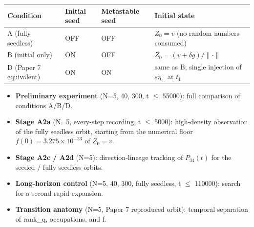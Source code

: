 \documentclass[
  a4paper,
]{article}
\newcounter{none} %
\providecommand{\tightlist}{%
  \setlength{\itemsep}{0pt}\setlength{\parskip}{0pt}}
\begin{document}
{\def\LTcaptype{none} %
\begin{longtable}[]{@{}
  >{\raggedright\arraybackslash}p{}
  >{\centering\arraybackslash}p{}
  >{\centering\arraybackslash}p{}
  >{\raggedright\arraybackslash}p{}@{}}
\toprule\noalign{}
\begin{minipage}[b]{\linewidth}\raggedright
Condition
\end{minipage} & \begin{minipage}[b]{\linewidth}\centering
Initial seed
\end{minipage} & \begin{minipage}[b]{\linewidth}\centering
Metastable seed
\end{minipage} & \begin{minipage}[b]{\linewidth}\raggedright
Initial state
\end{minipage} \\
\midrule\noalign{}
\endhead
\bottomrule\noalign{}
\endlastfoot
A (fully seedless) & OFF & OFF & \(Z_0=v\) (no random numbers
consumed) \\
B (initial only) & ON & OFF & \(Z_0=(v+\delta g)/\lVert\cdot\rVert\) \\
D (Paper 7 equivalent) & ON & ON & same as B; single injection of
\(\varepsilon\eta_\perp\) at \(t_1\) \\
\end{longtable}
}

\begin{itemize}
\tightlist
\item
  \textbf{Preliminary experiment} (N=5, 40, 300, t \(\le\) 55000): full
  comparison of conditions A/B/D.
\item
  \textbf{Stage A2a} (N=5, every-step recording, t \(\le\) 5000):
  high-density observation of the fully seedless orbit, starting from
  the numerical floor \(f(0)=3.275\times10^{-33}\) of \(Z_0=v\).
\item
  \textbf{Stage A2c / A2d} (N=5): direction-lineage tracking of
  \(P_{34}(t)\) for the seeded / fully seedless orbits.
\item
  \textbf{Long-horizon control} (N=5, 40, 300, fully seedless, t \(\le\)
  110000): search for a second rapid expansion.
\item
  \textbf{Transition anatomy} (N=5, Paper 7 reproduced orbit): temporal
  separation of rank\_q, occupations, and f.
\end{itemize}
\end{document}
